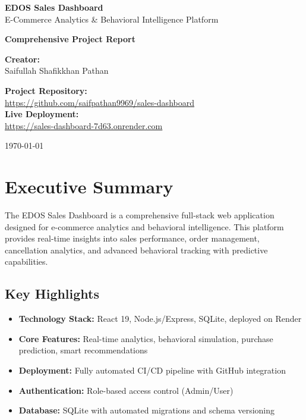 \documentclass[12pt,a4paper]{article}
\begin{document}
\begin{titlepage}
    \centering
    \vspace*{2cm}
    
    {\Huge\bfseries\color{primarycolor} EDOS Sales Dashboard\\[0.5cm]}
    {\LARGE\color{secondarycolor} E-Commerce Analytics \& Behavioral Intelligence Platform\\[2cm]}
    
    {\Large\textbf{Comprehensive Project Report}\\[1cm]}
    
    \vfill
    
    {\large
    \textbf{Creator:}\\[0.3cm]
    {\Large Saifullah Shafikkhan Pathan}\\[2cm]
    }
    
    {\large
    \textbf{Project Repository:}\\
    \url{https://github.com/saifpathan9969/sales-dashboard}\\[0.5cm]
    
    \textbf{Live Deployment:}\\
    \url{https://sales-dashboard-7d63.onrender.com}\\[2cm]
    }
    
    {\large \today}
    
\end{titlepage}

\tableofcontents
\newpage

\section{Executive Summary}

The EDOS Sales Dashboard is a comprehensive full-stack web application designed for e-commerce analytics and behavioral intelligence. This platform provides real-time insights into sales performance, order management, cancellation analytics, and advanced behavioral tracking with predictive capabilities.

\subsection{Key Highlights}
\begin{itemize}[leftmargin=*]
    \item \textbf{Technology Stack:} React 19, Node.js/Express, SQLite, deployed on Render
    \item \textbf{Core Features:} Real-time analytics, behavioral simulation, purchase prediction, smart recommendations
    \item \textbf{Deployment:} Fully automated CI/CD pipeline with GitHub integration
    \item \textbf{Authentication:} Role-based access control (Admin/User)
    \item \textbf{Database:} SQLite with automated migrations and schema versioning
\end{itemize}
\end{document}
